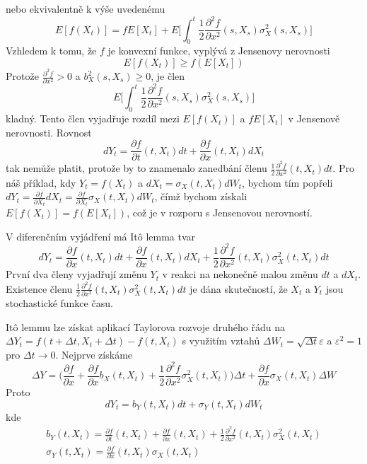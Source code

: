 \documentclass[a4paper]{book}
\begin{document}
nebo ekvivalentně k výše uvedenému
\begin{equation*}
E[f(X_t)] = f E[X_t] + E \Big[ \int_0^t \frac{1}{2} \frac{\partial^2 f}{\partial x^2}(s, X_s) \sigma_X^2(s, X_s)\Big]
\end{equation*}
Vzhledem k tomu, že $f$ je konvexní funkce, vyplývá z Jensenovy nerovnosti
\begin{equation*}
E[f(X_t)] \ge f(E[X_t])
\end{equation*}
Protože $\frac{\partial^2 f}{\partial x^2} > 0$ a $b_X^2(s, X_s) \ge 0$, je člen
\begin{equation*}
E \Big[ \int_0^t \frac{1}{2} \frac{\partial^2 f}{\partial x^2}(s, X_s) \sigma_X^2(s, X_s)\Big]
\end{equation*}
kladný. Tento člen vyjadřuje rozdíl mezi $E[f(X_t)]$ a $fE[X_t]$ v Jensenově nerovnosti. Rovnost
\begin{equation*}
d Y_t = \frac{\partial f}{\partial t}(t, X_t) dt + \frac{\partial f}{\partial x}(t, X_t)d X_t
\end{equation*}
tak nemůže platit, protože by to znamenalo zanedbání členu $\frac{1}{2} \frac{\partial^2 f}{\partial x^2}(t, X_t)dt$. Pro náš příklad, kdy $Y_t = f(X_t)$ a $d X_t = \sigma_X(t, X_t)d W_t$, bychom tím popřeli $dY_t = \frac{\partial f}{\partial X_t}dX_t = \frac{\partial f}{\partial X_t}\sigma_X(t, X_t)d W_t$, čímž bychom získali $E[f(X_t)] = f(E[X_t])$, což je v rozporu s Jensenovou nerovností.

V diferenčním vyjádření má It\^o lemma tvar
\begin{equation*}
d Y_t = \frac{\partial f}{\partial x}(t, X_t)dt + \frac{\partial f}{\partial x}(t, X_t)dX_t + \frac{1}{2}\frac{\partial^2 f}{\partial x^2}(t, X_t)\sigma_X^2(t, X_t)dt
\end{equation*}
První dva členy vyjadřují změnu $Y_t$ v reakci na nekonečně malou změnu $dt$ a $d X_t$. Existence členu $\frac{1}{2}\frac{\partial^2 f}{\partial x^2}(t, X_t)\sigma_X^2(t, X_t)dt$ je dána skutečností, že $X_t$ a $Y_t$ jsou stochastické funkce času.

It\^o lemmu lze získat aplikací Taylorova rozvoje druhého řádu na $\Delta Y_t = f(t + \Delta t, X_t + \Delta t) - f(t, X_t)$ s využitím vztahů $\Delta W_t = \sqrt{\Delta t}\varepsilon$ a $\varepsilon^2 = 1$ pro $\Delta t \rightarrow 0$. Nejprve získáme
\begin{equation*}
\Delta Y = \Big( \frac{\partial f}{\partial x} + \frac{\partial f}{\partial x}b_X(t, X_t) + \frac{1}{2}\frac{\partial^2 f}{\partial x^2}\sigma_X^2(t, X_t) \Big) \Delta t + \frac{\partial f}{\partial x}\sigma_X(t, X_t)\Delta W
\end{equation*}
Proto
\begin{equation*}
d Y_t = b_Y(t, X_t)dt + \sigma_Y(t, X_t)d W_t
\end{equation*}
kde
\begin{gather*}
b_Y(t, X_t) = \frac{\partial f}{\partial t}(t, X_t) + \frac{\partial f}{\partial x}(t, X_t) + \frac{1}{2} \frac{\partial^2 f}{\partial x^2}(t, X_t)\sigma_X^2(t, X_t)\\
\sigma_Y(t, X_t) = \frac{\partial f}{\partial x}(t, X_t)\sigma_X(t, X_t)
\end{gather*}
\end{document}
